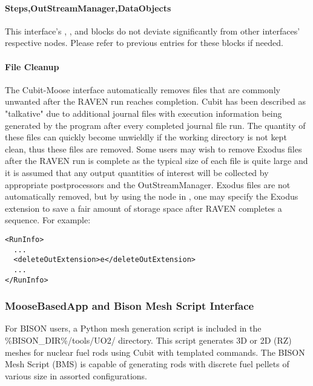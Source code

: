 \paragraph{Steps,OutStreamManager,DataObjects}
This interface's , , and 
 blocks do not deviate significantly from 
other interfaces' respective nodes.  Please refer to previous 
entries for these blocks if needed. 

\paragraph{File Cleanup}
The Cubit-Moose interface automatically removes files that are commonly
unwanted after the RAVEN run reaches completion. Cubit has been described as 
"talkative" due to additional journal files with execution information
being generated by the program after every completed journal file run.  
The quantity of these files can quickly become unwieldly if the working
directory is not kept clean, thus these files are removed.  Some users
may wish to remove Exodus files after the RAVEN run is complete as
the typical size of each file is quite large and it is assumed that any
output quantities of interest will be collected by appropriate postprocessors
and the OutStreamManager.  Exodus files are not automatically removed,
but by using the  node in , one 
may specify the Exodus extension to save a fair amount of storage space
after RAVEN completes a sequence. For example:

\begin{lstlisting}[style=XML]
<RunInfo>
  ...
  <deleteOutExtension>e</deleteOutExtension>
  ...
</RunInfo>
\end{lstlisting}

\subsubsection{MooseBasedApp and Bison Mesh Script Interface}
For BISON users, a Python mesh generation script is included in 
the \%BISON\_DIR\%/tools/UO2/ directory.  This script generates 
3D or 2D (RZ) meshes for nuclear fuel rods using Cubit with 
templated commands.  The BISON Mesh Script (BMS) is capable of 
generating rods with discrete fuel pellets of various size in 
assorted configurations.

